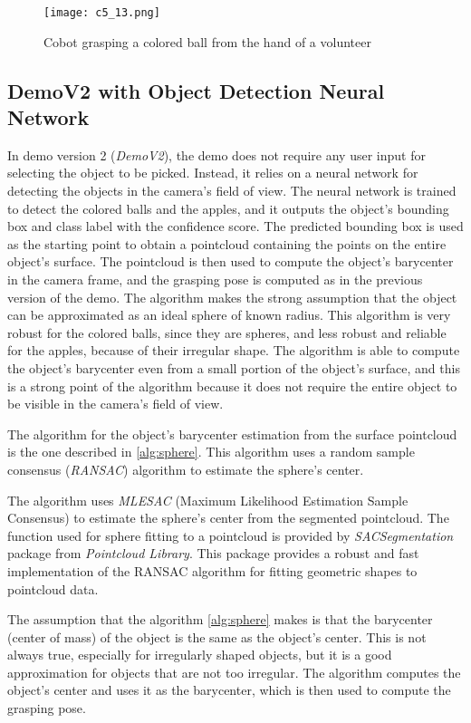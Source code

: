 \begin{figure}[t]
    \centering
    \texttt{[image: c5\_13.png]}
    \caption{Cobot grasping a colored ball from the hand of a volunteer}
    \label{fig:bp1}
\end{figure}

\subsection{DemoV2 with Object Detection Neural Network}

In demo version 2 (\textit{DemoV2}), the demo does not require any user input for selecting the object to be picked.
Instead, it relies on a neural network for detecting the objects in the camera's field of view. The neural network
is trained to detect the colored balls and the apples, and it outputs the object's bounding box and class label
with the confidence score. The predicted bounding box is used as the starting point to obtain a pointcloud
containing the points on the entire object's surface. The pointcloud is then used to compute the object's barycenter
in the camera frame, and the grasping pose is computed as in the previous version of the demo.
The algorithm makes the strong assumption that the object can be approximated as an ideal sphere of known radius.
This algorithm is very robust for the colored balls, since they are spheres, and less robust and reliable
for the apples, because of their irregular shape. The algorithm is able to compute the object's barycenter
even from a small portion of the object's surface, and this is a strong point of the algorithm because
it does not require the entire object to be visible in the camera's field of view.

The algorithm for the object's barycenter estimation from the surface pointcloud is the one described
in \ref{alg:sphere}. This algorithm uses a random sample consensus (\textit{RANSAC}) algorithm to estimate 
the sphere's center.

The algorithm uses \textit{MLESAC} (Maximum Likelihood Estimation Sample Consensus) to estimate the sphere's center
from the segmented pointcloud. The function used for sphere fitting to a pointcloud is provided by
\textit{SACSegmentation} package from \textit{Pointcloud Library}. This package provides a robust and fast
implementation of the RANSAC algorithm for fitting geometric shapes to pointcloud data. 

The assumption that the algorithm \ref{alg:sphere} makes is that the barycenter (center of mass) of the object
is the same as the object's center. This is not always true, especially for irregularly shaped objects, but
it is a good approximation for objects that are not too irregular. The algorithm computes the object's center
and uses it as the barycenter, which is then used to compute the grasping pose.

